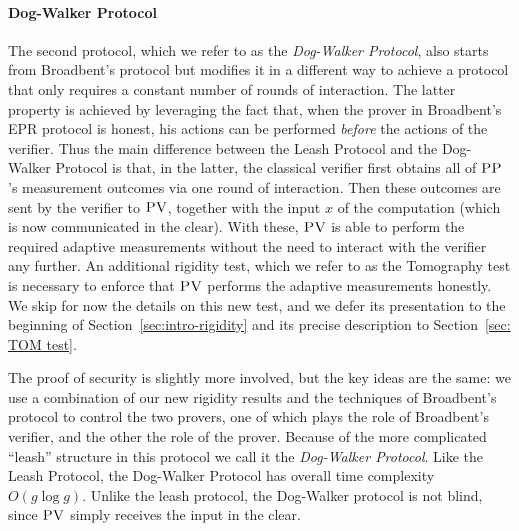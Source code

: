 \paragraph{Dog-Walker Protocol}
The second protocol, which we refer to as the \emph{Dog-Walker Protocol}, also starts from Broadbent's protocol but modifies it in a
different way to achieve a protocol that only requires a constant number of rounds of
interaction. 
The latter property is achieved by leveraging the fact that, when the prover in Broadbent's EPR protocol is honest, his actions can be performed \emph{before} the actions of the verifier.
Thus the main difference between the Leash Protocol and the Dog-Walker Protocol is that, in the latter, the classical verifier first obtains all of $\textsc{PP}$'s measurement outcomes via one round of interaction. Then these outcomes are sent by the verifier to $\textsc{PV}$, together with the input $x$ of the computation (which is now communicated in the clear). With these, $\textsc{PV}$ is able to perform the required adaptive measurements without the need to interact with the verifier any further. An additional rigidity test, which we refer to as the Tomography test is necessary to enforce that $\textsc{PV}$ performs the adaptive measurements honestly. We skip for now the details on this new test, and we defer its presentation to the beginning of Section~\ref{sec:intro-rigidity} and its precise description to Section~\ref{sec: TOM test}.

The proof of security is slightly more involved, but the key ideas are the same: we use a combination of our new rigidity results and the techniques of Broadbent's protocol to control the two provers, one of which plays the role of Broadbent's verifier, and the other the role of the prover. Because of the more complicated ``leash'' structure in this protocol we call it the \emph{Dog-Walker Protocol}. 
 Like the Leash Protocol, the Dog-Walker Protocol has overall time complexity $O(g\log g)$. Unlike the leash protocol, the Dog-Walker protocol is not blind, since $\textsc{PV}$ simply receives the input in the clear.


